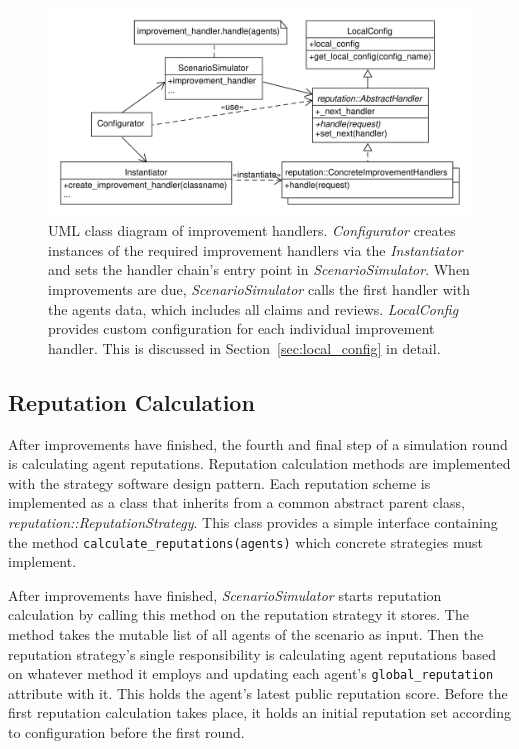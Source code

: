 \documentclass[%
    ]{\PathToTumTemplate/thesis/tum_thesis}
\begin{document}
\begin{figure}[tbp]
  \begin{center}
        \includegraphics[width=1\linewidth]	{../uml/improvement_handlers.pdf}
    \caption{
	UML class diagram of improvement handlers. 
	\emph{Configurator} creates instances of the required improvement handlers via the \emph{Instantiator} and sets the handler chain's entry point in \emph{ScenarioSimulator}.
	When improvements are due, \emph{ScenarioSimulator} calls the first handler with the agents data, which includes all claims and reviews.
	\emph{LocalConfig} provides custom configuration for each individual improvement handler.
	This is discussed in Section~\ref{sec:local_config} in detail.
    }
    \label{fig:improvement_handlers}
  \end{center}
\end{figure}

\subsection{Reputation Calculation}\label{sec:impl_reputation_calculation}

After improvements have finished, the fourth and final step of a simulation round is calculating agent reputations.
Reputation calculation methods are implemented with the strategy software design pattern.
Each reputation scheme is implemented as a class that inherits from a common abstract parent class, \emph{reputation::ReputationStrategy}.
This class provides a simple interface containing the method \texttt{calculate\_reputations(agents)} which concrete strategies must implement.

After improvements have finished, \emph{ScenarioSimulator} starts reputation calculation by calling this method on the reputation strategy it stores.
The method takes the mutable list of all agents of the scenario as input.
Then the reputation strategy's single responsibility is calculating agent reputations based on whatever method it employs and updating each agent's \texttt{global\_reputation} attribute with it.
This holds the agent's latest public reputation score.
Before the first reputation calculation takes place, it holds an initial reputation set according to configuration before the first round.
\end{document}
